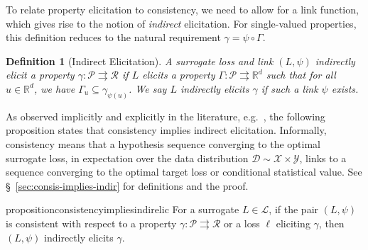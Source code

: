 \documentclass[11pt]{article} %
\newcommand{\Comments}{1}
\newcommand{\mytodo}[2]{\ifnum\Comments=1%
	\todo[linecolor=#1!80!black,backgroundcolor=#1,bordercolor=#1!80!black]{#2}\fi}
\newcommand{\btw}[1]{}%
\newcommand{\reals}{\mathbb{R}}
\newcommand{\D}{\mathcal{D}}
\renewcommand{\L}{\mathcal{L}}
\newcommand{\R}{\mathcal{R}}
\renewcommand{\P}{\mathcal{P}}
\newcommand{\X}{\mathcal{X}}
\newcommand{\Y}{\mathcal{Y}}
\newcommand{\toto}{\rightrightarrows}
\newtheorem{definition}{Definition}
\begin{document}
To relate property elicitation to consistency, we need to allow for a link function, which gives rise to the notion of \emph{indirect} elicitation.
For single-valued properties, this definition reduces to the natural requirement $\gamma = \psi \circ \Gamma$.
\begin{definition}[Indirect Elicitation]\label{def:indirectly-elicits}
	A surrogate loss and link $(L, \psi)$ \emph{indirectly elicit} a property $\gamma:\P \toto \R$ if $L$ elicits a property $\Gamma: \P \toto \reals^d$ such that for all $u \in \reals^d$, we have $\Gamma_u \subseteq \gamma_{\psi(u)}$.
	We say $L$ \emph{indirectly elicits} $\gamma$ if such a link $\psi$ exists.
  \btw{interesting discussion of set-valued properties commented out; revive later!}
\end{definition}

As observed implicitly and explicitly in the literature, e.g.~\citep{steinwart2008support,agarwal2015consistent}, the following proposition states that consistency implies indirect elicitation.
Informally, consistency means that a hypothesis sequence converging to the optimal surrogate loss, in expectation over the data distribution $\D \sim \X \times \Y$, links to a sequence converging to the optimal target loss or conditional statistical value.
See \S~\ref{sec:consis-implies-indir} for definitions and the proof.

\begin{restatable}{proposition}{consistencyimpliesindirelic}\label{thm:consistent-implies-indir-elic}
	For a surrogate $L \in \L$, if the pair $(L, \psi)$ is consistent with respect to a property $\gamma: \P \toto \R$ or a loss $\ell$ eliciting $\gamma$, then $(L, \psi)$ indirectly elicits $\gamma$.
\end{restatable}

\end{document}
